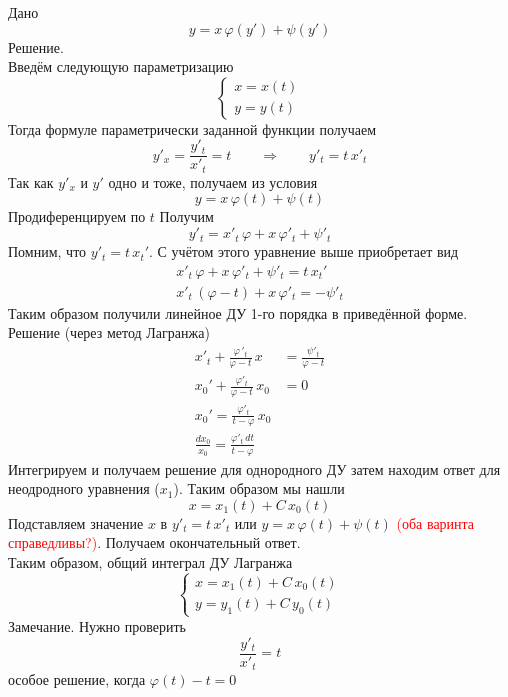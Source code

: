\begin{Note}
    Дано
    \[
        y=x\,\varphi(y')+\psi(y')
    \]
    Решение.\\
    Введём следующую параметризацию
    \[
        \begin{cases}
            x = x(t)\\
            y = y(t)
        \end{cases}
    \]
    Тогда формуле параметрически заданной функции получаем
    \[
        y'_x=\frac{y'_t}{x'_t}=t \qquad \Rightarrow \qquad y'_t=t\,x'_t
    \]
    Так как $y'_x$ и $y'$ одно и тоже, получаем из условия
    \[
        y = x\,\varphi(t) + \psi(t)
    \]
    Продиференцируем по $t$ Получим
    \[
        y'_t = x'_t\,\varphi + x\,\varphi'_t + \psi'_t
    \]
    Помним, что $y'_t = t \, x_t'$. С учётом этого уравнение выше приобретает вид
    \begin{align*}
        x'_t\,\varphi + x\,\varphi'_t + \psi'_t = t \, x_t'\\
        x'_t\,(\varphi - t) + x\,\varphi'_t = -\psi'_t
    \end{align*}
    Таким образом получили линейное ДУ 1-го порядка в приведённой форме. Решение (через метод Лагранжа)
    \begin{align*}
        x'_t + \frac{\varphi\,'_t}{\varphi-t}\,x &= \frac{\psi'_t}{\varphi-t}\\
        x_0' + \frac{\varphi'_t}{\varphi-t}\,x_0 &= 0\\
        x_0' = \frac{\varphi'_t}{t - \varphi}\,x_0\\
        \frac{dx_0}{x_0} = \frac{\varphi'_t\, dt}{t - \varphi}
    \end{align*}
    Интегрируем и получаем решение для однородного ДУ затем находим ответ для неодродного уравнения ($x_1$). Таким образом мы нашли 
    \[
        x=x_1(t)+C\,x_0(t)
    \]
    Подставляем значение $x$ в $y'_t=t\,x'_t$ или $y = x\,\varphi(t) + \psi(t)$ \textcolor{red}{(оба варинта справедливы?)}. Получаем окончательный ответ.\\
    Таким образом, общий интеграл ДУ Лагранжа
    \[
        \begin{cases}
            x=x_1(t)+C\,x_0(t)\\
            y=y_1(t)+C\,y_0(t)
        \end{cases}
    \]
    Замечание. Нужно проверить\\
    \[
        \frac{y'_t}{x'_t}=t
    \]
    особое решение, когда $\varphi(t)-t=0$\\
\end{Note}



